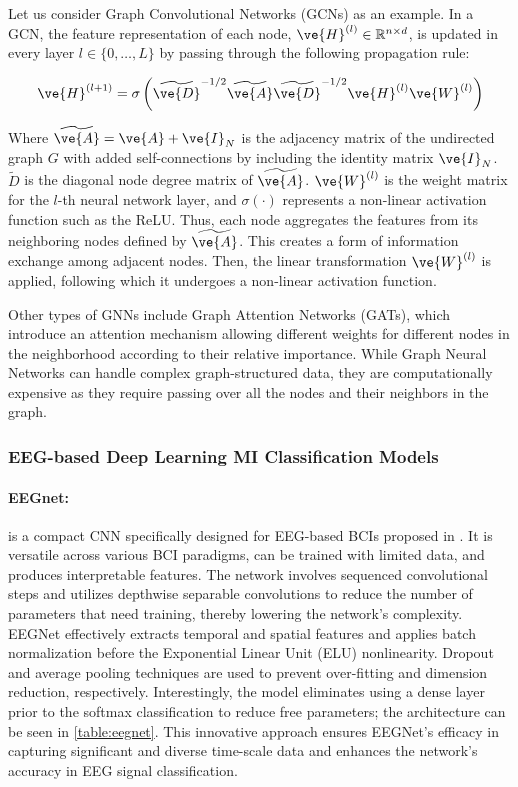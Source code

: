 Let us consider Graph Convolutional Networks (GCNs) as an example. In a GCN, the feature representation of each node, $\ve{H}^{(l)} \in \mathbb{R}^{n \times d}$, is updated in every layer $l \in \{0, \ldots, L\}$ by passing through the following propagation rule:

\begin{equation}
\ve{H}^{(l+1)} = \sigma\left(\widetilde{\ve{D}}^{-1/2}\widetilde{\ve{A}}\widetilde{\ve{D}}^{-1/2} \ve{H}^{(l)}\ve{W}^{(l)}\right)
\end{equation}

Where $\widetilde{\ve{A}} = \ve{A} + \ve{I}_N $ is the adjacency matrix of the undirected graph $G$ with added self-connections by including the identity matrix $\ve{I}_N$. $\widetilde{D}$ is the diagonal node degree matrix of $\widetilde{\ve{A}}$. $\ve{W}^{(l)}$ is the weight matrix for the $l$-th neural network layer, and $\sigma(\cdot)$ represents a non-linear activation function such as the ReLU. Thus, each node aggregates the features from its neighboring nodes defined by $\widetilde{\ve{A}}$. This creates a form of information exchange among adjacent nodes. Then, the linear transformation $\ve{W}^{(l)}$ is applied, following which it undergoes a non-linear activation function.

Other types of GNNs include Graph Attention Networks (GATs), which introduce an attention mechanism allowing different weights for different nodes in the neighborhood according to their relative importance. While Graph Neural Networks can handle complex graph-structured data, they are computationally expensive as they require passing over all the nodes and their neighbors in the graph.

\subsubsection{EEG-based Deep Learning MI Classification Models}

\paragraph{EEGnet:} is a compact CNN specifically designed for EEG-based BCIs proposed in \cite{lawhern2018eegnet}. It is versatile across various BCI paradigms, can be trained with limited data, and produces interpretable features. The network involves sequenced convolutional steps and utilizes depthwise separable convolutions to reduce the number of parameters that need training, thereby lowering the network's complexity. EEGNet effectively extracts temporal and spatial features and applies batch normalization before the Exponential Linear Unit (ELU) nonlinearity. Dropout and average pooling techniques are used to prevent over-fitting and dimension reduction, respectively. Interestingly, the model eliminates using a dense layer prior to the softmax classification to reduce free parameters; the architecture can be seen in \cref{table:eegnet}. This innovative approach ensures EEGNet's efficacy in capturing significant and diverse time-scale data and enhances the network's accuracy in EEG signal classification.

